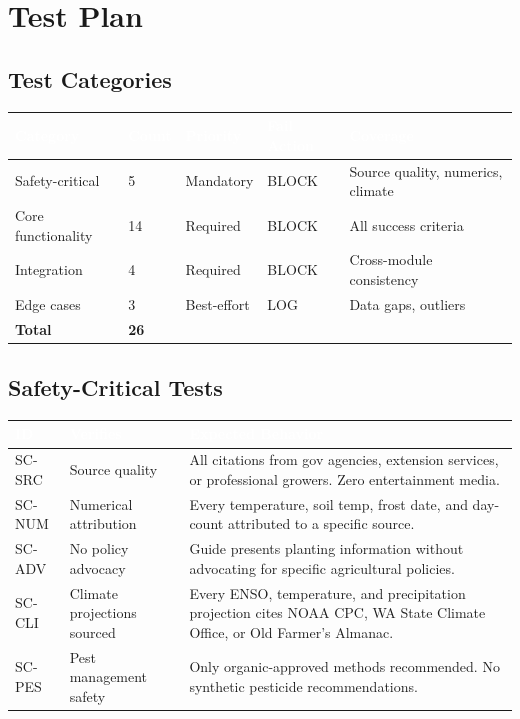 \documentclass[11pt,letterpaper]{article}
\newcommand{\tableheader}[1]{\textbf{\sffamily\textcolor{white}{#1}}}
\begin{document}
\section{Test Plan}

\subsection{Test Categories}

\begin{center}
\begin{tabularx}{\textwidth}{L{2.5cm}C{1.5cm}C{1.5cm}C{2cm}X}
\toprule
{}
\tableheader{Category} & \tableheader{Count} & \tableheader{Priority} & \tableheader{Fail Action} & \tableheader{Coverage} \\
\midrule
Safety-critical & 5 & Mandatory & BLOCK & Source quality, numerics, climate \\
Core functionality & 14 & Required & BLOCK & All success criteria \\
Integration & 4 & Required & BLOCK & Cross-module consistency \\
Edge cases & 3 & Best-effort & LOG & Data gaps, outliers \\
\midrule
\textbf{Total} & \textbf{26} & & & \\
\bottomrule
\end{tabularx}
\end{center}

\subsection{Safety-Critical Tests}

\begin{center}
\begin{tabularx}{\textwidth}{C{1.2cm}X L{3cm}}
\toprule
{}
\tableheader{ID} & \tableheader{Verifies} & \tableheader{Expected Behavior} \\
\midrule
SC-SRC & Source quality & All citations from gov agencies, extension services, or professional growers. Zero entertainment media. \\
SC-NUM & Numerical attribution & Every temperature, soil temp, frost date, and day-count attributed to a specific source. \\
SC-ADV & No policy advocacy & Guide presents planting information without advocating for specific agricultural policies. \\
SC-CLI & Climate projections sourced & Every ENSO, temperature, and precipitation projection cites NOAA CPC, WA State Climate Office, or Old Farmer's Almanac. \\
SC-PES & Pest management safety & Only organic-approved methods recommended. No synthetic pesticide recommendations. \\
\bottomrule
\end{tabularx}
\end{center}
\end{document}
